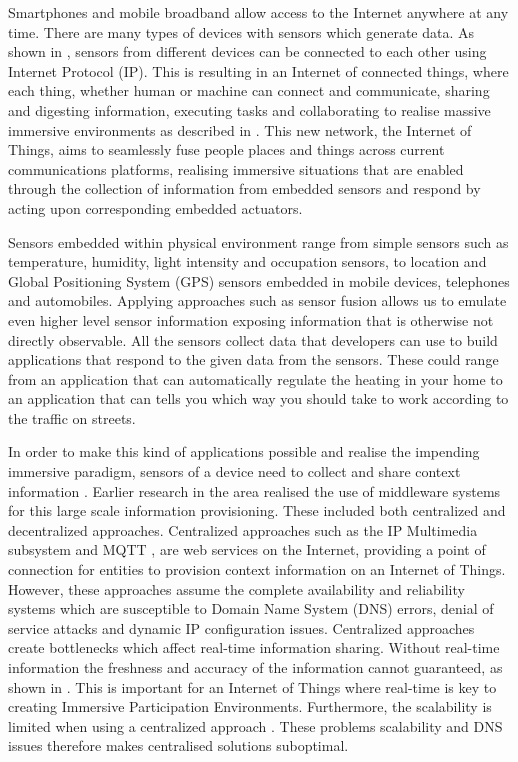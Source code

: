Smartphones and mobile broadband allow access to the Internet anywhere at any time. There are many types of devices with sensors which generate data. As shown in \cite{chui2010internet}, sensors from different devices can be connected to each other using Internet Protocol (IP). This is resulting in an Internet of connected things, where each thing, whether human or machine can connect and communicate, sharing and digesting information, executing tasks and collaborating to realise massive immersive environments as described in \cite{tan2010future}. This new network, the Internet of Things, aims to seamlessly fuse people places and things across current communications platforms, realising immersive situations that are enabled through the collection of information from embedded sensors and respond by acting upon corresponding embedded actuators. 

Sensors embedded within physical environment range from simple sensors such as temperature, humidity, light intensity and occupation sensors, to location and Global Positioning System (GPS) sensors embedded in mobile devices, telephones and automobiles. Applying approaches such as sensor fusion allows us to emulate even higher level sensor information exposing information that is otherwise not directly observable. All the sensors collect data that developers can use to build applications that respond to the given data from the sensors. These could range from an application that can automatically regulate the heating in your home to an application that can tells you which way you should take to work according to the traffic on streets.

In order to make this kind of applications possible and realise the impending immersive paradigm, sensors of a device need to collect and share context information \cite{dey2001understanding}. Earlier research in the area realised the use of middleware systems for this large scale information provisioning. These included both centralized and decentralized approaches. Centralized approaches such as the IP Multimedia subsystem \cite{Kardeby:2010:UMF:1845879.1846331} and MQTT \cite{HunkelerTS08}, are web services on the Internet, providing a point of connection for entities to provision context information on an Internet of Things. However, these approaches assume the complete availability and reliability systems which are susceptible to Domain Name System (DNS) errors, denial of service attacks and dynamic IP configuration issues. Centralized approaches create bottlenecks which affect real-time information sharing. Without real-time information the freshness and accuracy of the information cannot guaranteed, as shown in \cite{Walters437970}. This is important for an Internet of Things where real-time is key to creating Immersive Participation Environments. Furthermore, the scalability is limited when using a centralized approach \cite{Kanter539187}. These problems scalability and DNS issues therefore makes centralised solutions suboptimal. %

